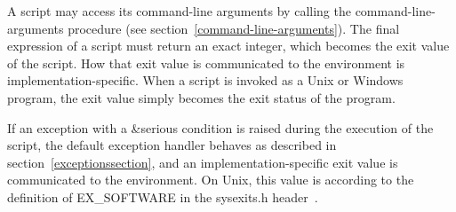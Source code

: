 A script may access its command-line arguments by calling the {\cf
  command-line-arguments} procedure (see
section~\ref{command-line-arguments}).  The final expression of a
script must return an exact integer, which becomes the exit value of
the script.  How that exit value is communicated to the environment is
implementation-specific.  When a script is invoked as a Unix or
Windows program, the exit value simply becomes the exit status of the
program.

If an exception with a {\cf\&serious} condition is raised during the
execution of the script, the default exception handler behaves as
described in section~\ref{exceptionssection}, and an
implementation-specific exit value is communicated to the
environment.  On Unix, this value is according to the definition of
{\cf EX\_SOFTWARE} in the {\cf sysexits.h} header~\cite{srfi22}.

